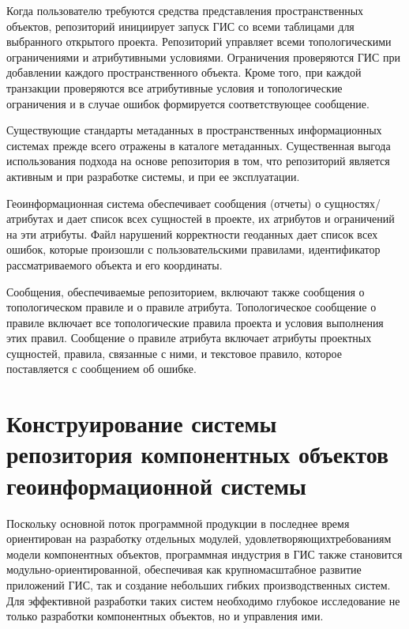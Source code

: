 \begin{multicols}{2}
      Когда пользователю требуются средства представления пространственных объектов, 
репозиторий инициирует запуск ГИС со всеми таблицами для выбранного открытого 
проекта. Репозиторий управляет всеми топологическими ограничениями и атрибутивными 
условиями. Ограничения проверяются ГИС при добавлении каждого пространственного 
объекта. Кроме того, при каждой транзакции проверяются все атрибутивные условия и 
топологические ограничения и в случае ошибок формируется соответствующее сообщение.
      
      Существующие стандарты метаданных в пространственных информационных 
системах прежде всего отражены в каталоге метаданных. Существенная выгода 
использования подхода на основе репозитория в том, что репозиторий является активным и 
при разработке системы, и при ее эксплуатации. 
      
Геоинформационная система 
обеспечивает сообщения (отчеты) о сущностях/атрибутах и дает список всех 
сущностей в проекте, их атрибутов и ограничений на эти атрибуты. Файл нарушений 
корректности геоданных дает список всех ошибок, которые произошли с 
пользовательскими правилами, идентификатор рас\-смат\-ри\-ва\-емо\-го объекта и его 
координаты. 
      
      Сообщения, обеспечиваемые репозиторием, включают также сообщения о 
топологическом правиле и о правиле атрибута. Топологическое сообщение о 
правиле включает все топологические правила проекта и условия выполнения этих правил. 
Сообщение о правиле атрибута включает атрибуты проектных сущностей, правила, 
связанные с ними, и текстовое правило, которое по\-став\-ля\-ет\-ся с сообщением об ошибке.

\section{Конструирование системы репозитория компонентных объектов 
геоинформационной системы}
      
      Поскольку основной поток программной продукции в последнее время 
ориентирован на раз\-работку отдельных модулей, удовле\-тво\-ря\-ющих\linebreak требованиям модели 
компонентных объектов,
 программная индустрия в ГИС также становится модульно-ориентированной, обеспечивая как крупномасштабное развитие приложений ГИС, так и 
создание небольших гибких производственных систем. Для эффективной разработки 
таких систем необходимо глубокое исследование не только разработки компонентных 
объектов, но и управления ими.
      

\end{multicols}
